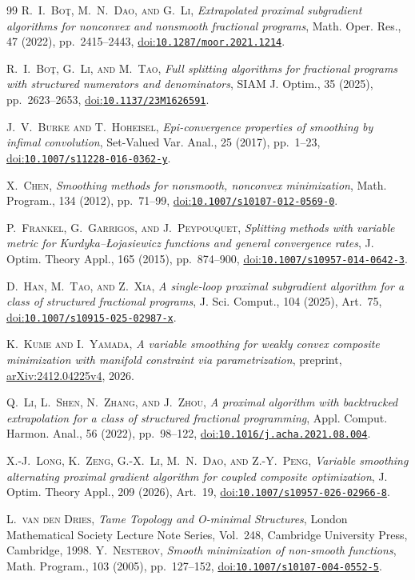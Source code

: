 \documentclass[9pt]{article}
\numberwithin{equation}{section}
\theoremstyle{definition}
\theoremstyle{remark}
\newcommand{\doi}[1]{\href{https://doi.org/#1}{doi:\nolinkurl{#1}}}
\begin{document}
\begin{thebibliography}{99}
\textsc{R.~I.~Bo\c{t}, M.~N.~Dao, and G.~Li},
\emph{Extrapolated proximal subgradient algorithms for nonconvex and
nonsmooth fractional programs}, Math. Oper. Res., 47 (2022),
pp.~2415--2443, \doi{10.1287/moor.2021.1214}.


\textsc{R.~I.~Bo\c{t}, G.~Li, and M.~Tao},
\emph{Full splitting algorithms for fractional programs with
structured numerators and denominators}, SIAM J. Optim.,
35 (2025), pp.~2623--2653, \doi{10.1137/23M1626591}.

\textsc{J.~V.~Burke and T.~Hoheisel},
\emph{Epi-convergence properties of smoothing by infimal convolution},
Set-Valued Var. Anal., 25 (2017), pp.~1--23,
\doi{10.1007/s11228-016-0362-y}.

\textsc{X.~Chen},
\emph{Smoothing methods for nonsmooth, nonconvex minimization},
Math. Program., 134 (2012), pp.~71--99,
\doi{10.1007/s10107-012-0569-0}.

\textsc{P.~Frankel, G.~Garrigos, and J.~Peypouquet},
\emph{Splitting methods with variable metric for
Kurdyka--\L{}ojasiewicz functions and general convergence rates},
J. Optim. Theory Appl., 165 (2015), pp.~874--900,
\doi{10.1007/s10957-014-0642-3}.

\textsc{D.~Han, M.~Tao, and Z.~Xia},
\emph{A single-loop proximal subgradient algorithm for a class of
structured fractional programs}, J. Sci. Comput., 104 (2025),
Art.~75, \doi{10.1007/s10915-025-02987-x}.


\textsc{K.~Kume and I.~Yamada},
\emph{A variable smoothing for weakly convex composite minimization
with manifold constraint via parametrization}, preprint,
\href{https://arxiv.org/abs/2412.04225v4}{arXiv:2412.04225v4}, 2026.



\textsc{Q.~Li, L.~Shen, N.~Zhang, and J.~Zhou},
\emph{A proximal algorithm with backtracked extrapolation for a class
of structured fractional programming}, Appl. Comput. Harmon. Anal.,
56 (2022), pp.~98--122, \doi{10.1016/j.acha.2021.08.004}.

\textsc{X.-J.~Long, K.~Zeng, G.-X.~Li, M.~N.~Dao, and Z.-Y.~Peng},
\emph{Variable smoothing alternating proximal gradient algorithm
for coupled composite optimization}, J. Optim. Theory Appl.,
209 (2026), Art.~19, \doi{10.1007/s10957-026-02966-8}.


\textsc{L.~van den Dries},
\emph{Tame Topology and O-minimal Structures},
London Mathematical Society Lecture Note Series, Vol.~248,
Cambridge University Press, Cambridge, 1998.
\textsc{Y.~Nesterov},
\emph{Smooth minimization of non-smooth functions},
Math. Program., 103 (2005), pp.~127--152,
\doi{10.1007/s10107-004-0552-5}.


\end{thebibliography}
\end{document}
